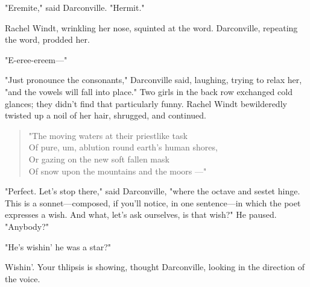   "Eremite," said Darconville. "Hermit."

  Rachel Windt, wrinkling her nose, squinted 
at the word. Darconville, repeating the word, prodded 
her.

  "E-eree-ereem---"

  "Just pronounce the consonants," Darconville said, laughing, trying to relax
her, "and the vowels will fall into place." Two girls in the back row exchanged
cold glances; they didn't find that particularly funny. Rachel Windt
bewilderedly twisted up a noil 
of her hair, shrugged, and continued.
 
\begin{verse}
        "The moving waters at their priestlike task  \\
        Of pure, um, ablution 
          round earth's human shores,  \\
        Or gazing on the new soft fallen mask  \\
        Of snow upon the mountains and the moors
        ---"
\end{verse}
 
  "Perfect. Let's stop there," said Darconville, "where the octave 
and sestet
hinge. 
This is a sonnet---composed, if you'll notice, in one sentence---in which the
poet expresses a wish. And what, let's ask ourselves, is that wish?" He paused.
"Anybody?"

  "He's wishin' he was a star?"

  Wishin'. Your thlipsis 
is showing, thought Darconville, looking in the direction of the voice.

